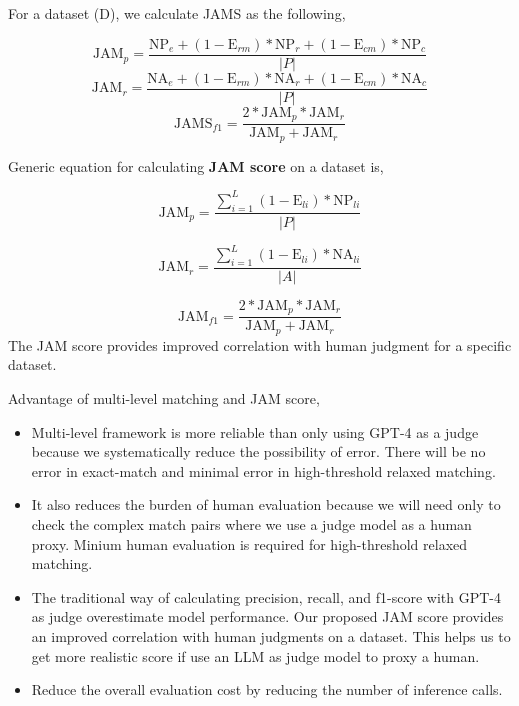 For a dataset (D), we calculate JAMS as the following, 

\[
\text{JAM}_{p} = \frac{\text{NP}_e +(1-\text{E}_{rm})* \text{NP}_r + (1-\text{E}_{cm})* \text{NP}_c}{|P|}
\]
\[
\text{JAM}_{r} = \frac{\text{NA}_e +(1-\text{E}_{rm})* \text{NA}_r + (1-\text{E}_{cm})* \text{NA}_c}{|P|}
\]
\[
\text{JAMS}_{f1} = \frac{2 * \text{JAM}_{p} * \text{JAM}_{r}}{\text{JAM}_{p}+\text{JAM}_{r}}
\]


Generic equation for calculating \textbf{JAM score} on a dataset is, 

\begin{equation}
   \text{JAM}_p = \frac{\sum_{i=1}^{L} (1-\text{E}_{li}) * \text{NP}_{li}}{|P|}
      \label{eq: jam-precision}
\end{equation}

\begin{equation}
   \text{JAM}_r = \frac{\sum_{i=1}^{L} (1-\text{E}_{li}) * \text{NA}_{li}}{|A|}
   \label{eq: jam-recall}
\end{equation}

\begin{equation}
   \text{JAM}_{f1} = \frac{2 * \text{JAM}_p * \text{JAM}_r}{\text{JAM}_p + \text{JAM}_r}
   \label{eq: jam-f1}
\end{equation}
The JAM score provides improved correlation with human judgment for a specific dataset.

Advantage of multi-level matching and JAM score,
\begin{itemize}
    \item Multi-level framework is more reliable than only using GPT-4 as a judge because we systematically reduce the possibility of error. There will be no error in exact-match and minimal error in high-threshold relaxed matching. 

    \item It also reduces the burden of human evaluation because we will need only to check the complex match pairs where we use a judge model as a human proxy. Minium human evaluation is required for high-threshold relaxed matching. 

     \item The traditional way of calculating precision, recall, and f1-score with GPT-4 as judge overestimate model performance. Our proposed JAM score provides an improved correlation with human judgments on a dataset. This helps us to get more realistic score if use an LLM as judge model to proxy a human. 

    \item Reduce the overall evaluation cost by reducing the number of inference calls. 
\end{itemize}

